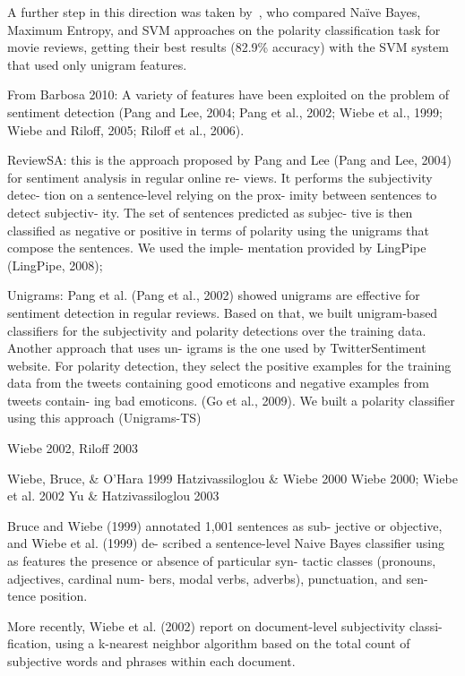 A further step in this direction was taken by~\citet{Pang:02}, who
compared Na{\"i}ve Bayes, Maximum Entropy, and SVM approaches on the
polarity classification task for movie reviews, getting their best
results (82.9\% accuracy) with the SVM system that used only unigram
features.

From Barbosa 2010: A variety of features have been exploited on the
problem of sentiment detection (Pang and Lee, 2004; Pang et al., 2002;
Wiebe et al., 1999; Wiebe and Riloff, 2005; Riloff et al., 2006).

ReviewSA: this is the approach proposed by Pang and Lee (Pang and Lee,
2004) for sentiment analysis in regular online re- views. It performs
the subjectivity detec- tion on a sentence-level relying on the prox-
imity between sentences to detect subjectiv- ity. The set of sentences
predicted as subjec- tive is then classified as negative or positive
in terms of polarity using the unigrams that compose the sentences. We
used the imple- mentation provided by LingPipe (LingPipe, 2008);

Unigrams: Pang et al. (Pang et al., 2002) showed unigrams are
effective for sentiment detection in regular reviews. Based on that,
we built unigram-based classifiers for the subjectivity and polarity
detections over the training data. Another approach that uses un-
igrams is the one used by TwitterSentiment website. For polarity
detection, they select the positive examples for the training data
from the tweets containing good emoticons and negative examples from
tweets contain- ing bad emoticons. (Go et al., 2009). We built a
polarity classifier using this approach (Unigrams-TS)



Wiebe 2002, Riloff 2003

Wiebe, Bruce, \& O'Hara 1999
Hatzivassiloglou \& Wiebe 2000
Wiebe 2000;
Wiebe et al. 2002
Yu \& Hatzivassiloglou 2003

Bruce and Wiebe (1999) annotated 1,001 sentences as sub- jective or
objective, and Wiebe et al. (1999) de- scribed a sentence-level Naive
Bayes classifier using as features the presence or absence of
particular syn- tactic classes (pronouns, adjectives, cardinal num-
bers, modal verbs, adverbs), punctuation, and sen- tence position.

More recently, Wiebe et al.  (2002) report on document-level
subjectivity classi- fication, using a k-nearest neighbor algorithm
based on the total count of subjective words and phrases within each
document.

